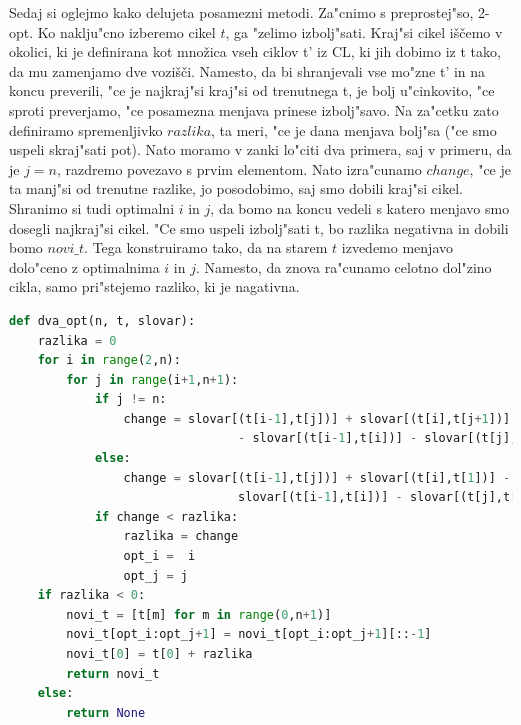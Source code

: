 \documentclass[12pt,a4paper]{amsart}
\theoremstyle{definition} %
\theoremstyle{plain} %
\begin{document}
Sedaj si oglejmo kako delujeta posamezni metodi. Za"cnimo s preprostej"so, 2-opt. 
Ko naklju"cno izberemo cikel $t$, ga "zelimo izbolj"sati. Kraj"si cikel iščemo v okolici, ki je definirana kot množica vseh ciklov t' iz CL, 
ki jih dobimo iz t tako, da mu zamenjamo dve vozišči. Namesto, da bi shranjevali vse mo"zne  t' in na koncu preverili, "ce je najkraj"si kraj"si od trenutnega t, je bolj u"cinkovito, "ce sproti preverjamo, "ce posamezna menjava prinese izbolj"savo. Na za"cetku zato definiramo spremenljivko $razlika$, ta meri, "ce je dana menjava bolj"sa ("ce smo uspeli skraj"sati pot).
 Nato moramo v zanki lo"citi dva primera, saj v primeru, da je $j = n$, razdremo povezavo s prvim elementom. Nato izra"cunamo $change$, "ce je ta manj"si od trenutne razlike, jo posodobimo, saj smo dobili kraj"si cikel. Shranimo si tudi optimalni $i$ in $j$, da bomo na koncu vedeli s katero menjavo smo dosegli najkraj"si cikel. "Ce smo uspeli izbolj"sati t, bo razlika negativna in dobili bomo $novi\_t$. Tega konstruiramo tako, da na starem $t$ izvedemo menjavo dolo"ceno z optimalnima $i$ in $j$. Namesto, da znova ra"cunamo celotno dol"zino cikla, samo pri"stejemo razliko, ki je nagativna. 

\begin{lstlisting}[language=Python]
def dva_opt(n, t, slovar):
    razlika = 0
    for i in range(2,n):
        for j in range(i+1,n+1):
            if j != n: 
                change = slovar[(t[i-1],t[j])] + slovar[(t[i],t[j+1])] 
								- slovar[(t[i-1],t[i])] - slovar[(t[j],t[j+1])]
            else: 
                change = slovar[(t[i-1],t[j])] + slovar[(t[i],t[1])] - 
								slovar[(t[i-1],t[i])] - slovar[(t[j],t[1])]
            if change < razlika:
                razlika = change 
                opt_i =  i 
                opt_j = j 
    if razlika < 0: 
        novi_t = [t[m] for m in range(0,n+1)] 
        novi_t[opt_i:opt_j+1] = novi_t[opt_i:opt_j+1][::-1] 
        novi_t[0] = t[0] + razlika  
        return novi_t
    else:
        return None 
\end{lstlisting}
\end{document}
